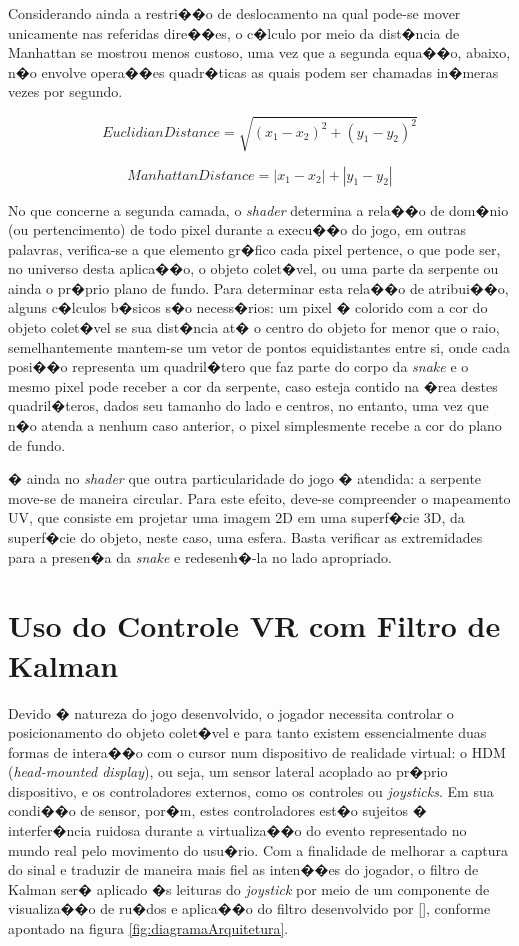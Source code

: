 \documentclass[12pt]{article}
\begin{document}
Considerando ainda a restri��o de deslocamento na qual pode-se mover unicamente nas referidas dire��es, o c�lculo por meio da dist�ncia de Manhattan se mostrou menos custoso, uma vez que a segunda equa��o, abaixo, n�o envolve opera��es quadr�ticas as quais podem ser chamadas in�meras vezes por segundo.

\begin{equation}
EuclidianDistance = \sqrt{(x_{1} - x_{2})^2 + (y_{1} - y_{2})^2}
\end{equation} 

\begin{equation}
ManhattanDistance = \left|x_{1} - x_{2}\right| + \left|y_{1} - y_{2}\right|
\end{equation}

No que concerne a segunda camada, o \textit{shader} determina a rela��o de dom�nio (ou pertencimento) de todo pixel durante a execu��o do jogo, em outras palavras, verifica-se a que elemento gr�fico cada pixel pertence, o que pode ser, no universo desta aplica��o, o objeto colet�vel, ou uma parte da serpente ou ainda o pr�prio plano de fundo. Para determinar esta rela��o de atribui��o, alguns c�lculos b�sicos s�o necess�rios: um pixel � colorido com a cor do objeto colet�vel se sua dist�ncia at� o centro do objeto for menor que o raio, semelhantemente mantem-se um vetor de pontos equidistantes entre si, onde cada posi��o representa um quadril�tero que faz parte do corpo da \textit{snake} e o mesmo pixel pode receber a cor da serpente, caso esteja contido na �rea destes quadril�teros, dados seu tamanho do lado e centros, no entanto, uma vez que n�o atenda a nenhum caso anterior, o pixel simplesmente recebe a cor do plano de fundo. 

� ainda no \textit{shader} que outra particularidade do jogo � atendida: a serpente move-se de maneira circular. Para este efeito, deve-se compreender o mapeamento UV, que consiste em projetar uma imagem 2D em uma superf�cie 3D, da superf�cie do objeto, neste caso, uma esfera. Basta verificar as extremidades para a presen�a da \textit{snake} e redesenh�-la no lado apropriado. 

\section{Uso do Controle VR com Filtro de Kalman} \label{sec:gearvrcontroller}
Devido � natureza do jogo desenvolvido, o jogador necessita controlar o posicionamento do objeto colet�vel e para tanto existem essencialmente duas formas de intera��o com o cursor num dispositivo de realidade virtual: o HDM (\textit{head-mounted display}), ou seja, um sensor lateral acoplado ao pr�prio dispositivo, e os controladores externos, como os controles ou \textit{joysticks}. Em sua condi��o de sensor, por�m, estes controladores est�o sujeitos � interfer�ncia ruidosa durante a virtualiza��o do evento representado no mundo real pelo movimento do usu�rio. Com a finalidade de melhorar a captura do sinal e traduzir de maneira mais fiel as inten��es do jogador, o filtro de Kalman ser� aplicado �s leituras do \textit{joystick} por meio de um componente de visualiza��o de ru�dos e aplica��o do filtro desenvolvido por [], conforme apontado na figura \ref{fig:diagramaArquitetura}.
\end{document}
